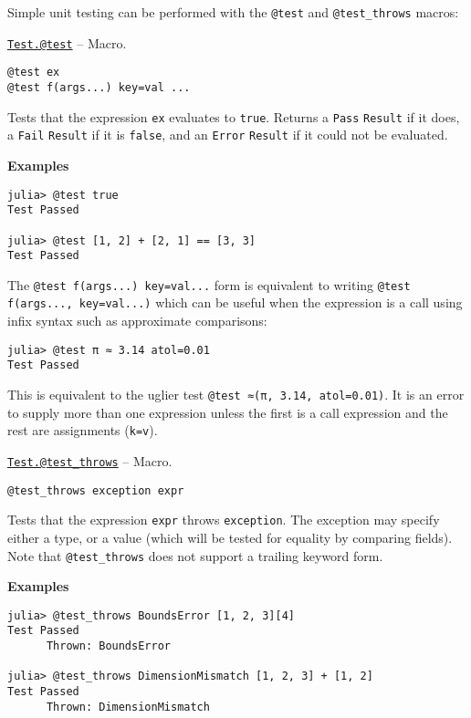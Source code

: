 Simple unit testing can be performed with the \texttt{@test} and \texttt{@test\_throws} macros:


\hypertarget{1038355522981819767}{} 
\hyperlink{1038355522981819767}{\texttt{Test.@test}}  -- {Macro.}

\begin{adjustwidth}{2em}{0pt}


\begin{verbatim}
@test ex
@test f(args...) key=val ...
\end{verbatim}

Tests that the expression \texttt{ex} evaluates to \texttt{true}. Returns a \texttt{Pass} \texttt{Result} if it does, a \texttt{Fail} \texttt{Result} if it is \texttt{false}, and an \texttt{Error} \texttt{Result} if it could not be evaluated.

\textbf{Examples}


\begin{verbatim}
julia> @test true
Test Passed

julia> @test [1, 2] + [2, 1] == [3, 3]
Test Passed
\end{verbatim}

The \texttt{@test f(args...) key=val...} form is equivalent to writing \texttt{@test f(args..., key=val...)} which can be useful when the expression is a call using infix syntax such as approximate comparisons:


\begin{verbatim}
julia> @test π ≈ 3.14 atol=0.01
Test Passed
\end{verbatim}

This is equivalent to the uglier test \texttt{@test ≈(π, 3.14, atol=0.01)}. It is an error to supply more than one expression unless the first is a call expression and the rest are assignments (\texttt{k=v}).



\end{adjustwidth}
\hypertarget{5527166796157013832}{} 
\hyperlink{5527166796157013832}{\texttt{Test.@test\_throws}}  -- {Macro.}

\begin{adjustwidth}{2em}{0pt}


\begin{verbatim}
@test_throws exception expr
\end{verbatim}

Tests that the expression \texttt{expr} throws \texttt{exception}. The exception may specify either a type, or a value (which will be tested for equality by comparing fields). Note that \texttt{@test\_throws} does not support a trailing keyword form.

\textbf{Examples}


\begin{verbatim}
julia> @test_throws BoundsError [1, 2, 3][4]
Test Passed
      Thrown: BoundsError

julia> @test_throws DimensionMismatch [1, 2, 3] + [1, 2]
Test Passed
      Thrown: DimensionMismatch
\end{verbatim}



\end{adjustwidth}

